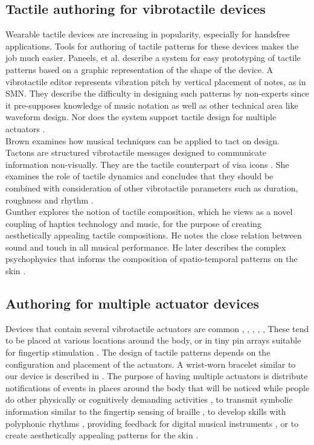 \documentclass[a4paper, twocolumn]{article}
\begin{document}
\subsection{Tactile authoring for vibrotactile devices}
Wearable tactile devices are increasing in popularity, especially for handsfree applications. Tools for authoring of tactile patterns for these devices makes the job much easier. Paneels, et al. describe a system for easy prototyping of tactile patterns based on a graphic representation of the shape of the device. A vibrotactile editor represents vibration pitch by vertical placement of notes, as in SMN. They describe the difficulty in designing such patterns by non-experts since it pre-supposes knowledge of music notation as well as other technical area like waveform design. Nor does the system support tactile design for multiple actuators \cite{paneels2013tactiped}.\\

Brown examines how musical techniques can be applied to tact on design. Tactons are structured vibrotactile messages designed to communicate information non-visually. They are the tactile counterpart of visa icons \cite{brewster2004tactons}. She examines the role of tactile dynamics and concludes that they should be combined with consideration of other vibrotactile parameters such as duration, roughness and rhythm \cite{brown2006tactile}.\\ 

Gunther explores the notion of tactile composition, which he views as a novel coupling of haptics technology and music, for the purpose of creating aesthetically appealing tactile compositions. He notes the close relation between sound and touch in all musical performance. He later describes the complex psychophysics that informs the composition of spatio-temporal patterns on the skin  \cite{gunther2003cutaneous}. 

\subsection{Authoring for multiple actuator devices}
Devices that contain several vibrotactile actuators are common \cite{gunther2003cutaneous}, \cite{lindeman2004towards}, \cite{lindeman2006wearable}, \cite{ertan1998wearable}, \cite{brown2007tactons}, These tend to be placed at various locations around the body, or in tiny pin arrays suitable for fingertip stimulation \cite{brewster2004tactons}. The design of tactile patterns depends on the configuration and placement of the actuators. A wrist-worn bracelet similar to our device is described in \cite{paneels2013tactiped}. The purpose of having multiple actuators is distribute notifications of events in places around the body that will be noticed while people do other physically or cognitively demanding activities \cite{lindeman2006wearable}, to transmit symbolic information similar to the fingertip sensing of braille \cite{brewster2004tactons}, to develop skills with polyphonic rhythms  \cite{holland2010feeling}, providing feedback for digital musical instruments \cite{marshall2006vibrotactile} \cite{schumacher2013vibrotactile}, or to create aesthetically appealing patterns for the skin \cite{gunther2003cutaneous}.
\end{document}
